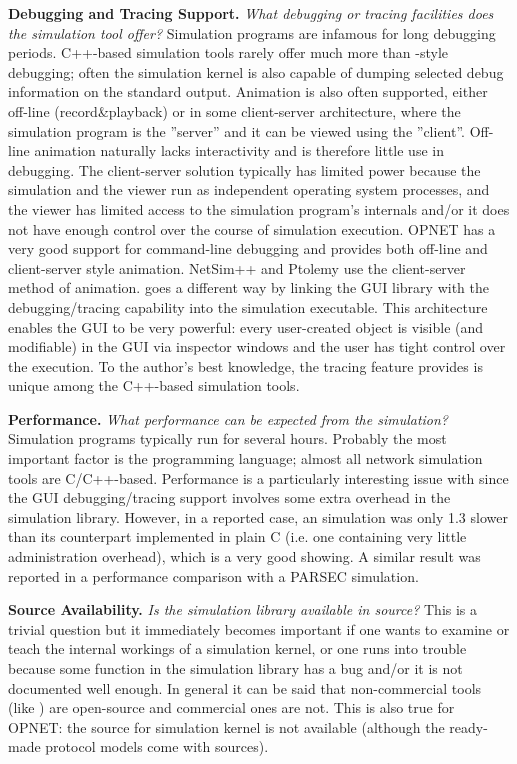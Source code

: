 \textbf{Debugging and Tracing Support.} \textit{What debugging or tracing 
facilities does the simulation tool offer?} Simulation programs 
are infamous for long debugging periods. C++-based simulation 
tools rarely offer much more than -style debugging; often 
the simulation kernel is also capable of dumping selected debug 
information on the standard output. Animation is also often supported, 
either off-line (record\&playback) or in some client-server architecture, 
where the simulation program is the ''server'' and 
it can be viewed using the ''client''. Off-line animation 
naturally lacks interactivity and is therefore little use in 
debugging. The client-server solution typically has limited power 
because the simulation and the viewer run as independent operating 
system processes, and the viewer has limited access to the simulation 
program's internals and/or it does not have enough control over 
the course of simulation execution. OPNET has a very good support 
for command-line debugging and provides both off-line and client-server 
style animation. NetSim++ and Ptolemy use the client-server method 
of animation. {\opp} goes a different way by linking the GUI 
library with the debugging/tracing capability into the simulation 
executable. This architecture enables the GUI to be very powerful: 
every user-created object is visible (and modifiable) in the 
GUI via inspector windows and the user has tight control over 
the execution. To the author's best knowledge, the tracing feature 
{\opp} provides is unique among the C++-based simulation tools. 


\textbf{Performance.} \textit{What performance can be expected from the 
simulation?} Simulation programs typically run for several hours. 
Probably the most important factor is the programming language; 
almost all network simulation tools are C/C++-based. Performance 
is a particularly interesting issue with {\opp} since the GUI 
debugging/tracing support involves some extra overhead in the 
simulation library. However, in a reported case, an {\opp} simulation 
was only 1.3 slower than its counterpart implemented in plain 
C (i.e. one containing very little administration overhead), 
which is a very good showing. A similar result was reported in 
a performance comparison with a PARSEC simulation. 


\textbf{Source Availability.} \textit{Is the simulation library available 
in source?} This is a trivial question but it immediately becomes 
important if one wants to examine or teach the internal workings 
of a simulation kernel, or one runs into trouble because some 
function in the simulation library has a bug and/or it is not 
documented well enough. In general it can be said that non-commercial 
tools (like {\opp}) are open-source and commercial ones are 
not. This is also true for OPNET: the source for simulation kernel 
is not available (although the ready-made protocol models come 
with sources).


